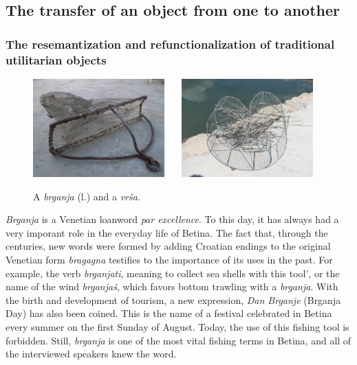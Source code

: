 \documentclass[output=paper]{LSP/langsci}
\begin{document}
\subsection{The transfer of an object from one  to another}
\subsubsection{The resemantization and refunctionalization of traditional utilitarian objects}



\begin{figure}[b]
\includegraphics[width=0.45\textwidth]{illustrations/skevin_fig4_brganja}~~~
\includegraphics[width=0.45\textwidth]{illustrations/skevin_fig4_vrsa}
\label{fig4_brganja_vrsa}
\caption{A \textit{brganja} (l.) and a \textit{vrša}.}
\end{figure}

\textit{Brganja} is a Venetian loanword \textit{par excellence}. To this day, it has always had a very imporant role in the everyday life of Betina. The fact that, through the centuries, new words were formed by adding Croatian endings to the original Venetian form \textit{bragagna} testifies to the importance of its uses in the past. For example, the verb \textit{brganjati}, meaning to collect sea shells with this tool', or the name of the wind \textit{brganjaš}, which favors bottom trawling with a \textit{brganja}. With the birth and development of tourism, a new expression, \textit{Dan Brganje} (Brganja Day) has also been coined. This is the name of a festival celebrated in Betina every summer on the first Sunday of August. Today, the use of this fishing tool is forbidden. Still, \textit{brganja} is one of the most vital fishing terms in Betina, and all of the interviewed speakers knew the word. 
\end{document}
